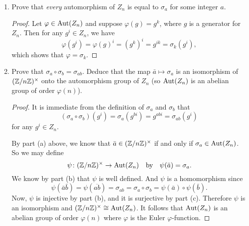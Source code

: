 \begin{enumerate}
\begin{proof}
    Conversely, if $a\equiv b\pmod{n}$ then $nc = a - b$ for some
    integer $c$ and we have for any $g^k\in Z_n$,
    \begin{equation*}
      \sigma_a(g^k) = g^{ak}
      = g^{(nc+b)k} = g^{bk}(g^n)^{ck} = g^{bk} = \sigma_b(g^k),
    \end{equation*}
    hence $\sigma_a = \sigma_b$ as required.
  \end{proof}
\item Prove that {\em every} automorphism of $Z_n$ is equal to
  $\sigma_a$ for some integer $a$.
  \begin{proof}
    Let $\varphi\in\operatorname{Aut}(Z_n)$ and suppose $\varphi(g) = g^k$, where
    $g$ is a generator for $Z_n$. Then for any $g^i\in Z_n$, we have
    \begin{equation*}
      \varphi(g^i) = \varphi(g)^i = (g^k)^i = g^{ik} = \sigma_k(g^i),
    \end{equation*}
    which shows that $\varphi = \sigma_k$.
  \end{proof}
\item Prove that $\sigma_a\circ\sigma_b = \sigma_{ab}$. Deduce that
  the map $\bar{a}\mapsto\sigma_a$ is an isomorphism of
  $(\mathbb{Z}/n\mathbb{Z})^\times$ onto the automorphism group of $Z_n$ (so
  $\operatorname{Aut}(Z_n)$ is an abelian group of order $\varphi(n)$).
  \begin{proof}
    It is immediate from the definition of $\sigma_a$ and $\sigma_b$
    that
    \begin{equation*}
      (\sigma_a\circ\sigma_b)(g^i) = \sigma_a(g^{bi})
      = g^{abi} = \sigma_{ab}(g^i)
    \end{equation*}
    for any $g^i\in Z_n$.

    By part (a) above, we know that $\bar{a}\in(\mathbb{Z}/n\mathbb{Z})^\times$ if and
    only if $\sigma_a\in\operatorname{Aut}(Z_n)$. So we may define
    \begin{equation*}
      \psi\colon(\mathbb{Z}/n\mathbb{Z})^\times\to \operatorname{Aut}(Z_n)
      \quad\text{by}\quad
      \psi(\bar{a}) = \sigma_a.
    \end{equation*}
    We know by part (b) that $\psi$ is well defined. And $\psi$ is a
    homomorphism since
    \begin{equation*}
      \psi(\bar{a}\bar{b}) = \psi(\overline{ab})
      = \sigma_{ab} = \sigma_a\circ\sigma_b
      = \psi(\bar{a})\circ\psi(\bar{b}).
    \end{equation*}
    Now, $\psi$ is injective by part (b), and it is surjective by part
    (c). Therefore $\psi$ is an isomorphism and
    $(\mathbb{Z}/n\mathbb{Z})^\times \cong \operatorname{Aut}(Z_n)$. It follows that $\operatorname{Aut}(Z_n)$ is
    an abelian group of order $\varphi(n)$ where $\varphi$ is the
    Euler $\varphi$-function.
  \end{proof}
\end{enumerate}
